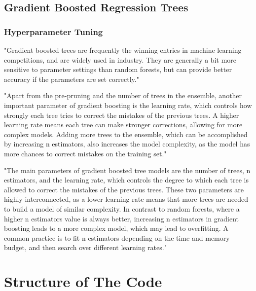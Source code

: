 \subsection{Gradient Boosted Regression Trees}

\subsubsection*{Hyperparameter Tuning}

"Gradient boosted trees are frequently the winning entries in machine
learning competitions, and are widely used in industry. They are
generally a bit more sensitive to parameter settings than random
forests, but can provide better accuracy if the parameters are set
correctly." \cite[p. 88-89]{muller_introductionmachinelearning_2016}

"Apart from the pre-pruning and the number of trees in the ensemble,
another important parameter of gradient boosting is the learning rate,
which controls how strongly each tree tries to correct the mistakes of
the previous trees. A higher learning rate means each tree can make
stronger corrections, allowing for more complex models. Adding more trees to the ensemble, which can be accomplished
by increasing
n estimators, also increases the model complexity, as the model has
more chances to correct mistakes on the training set." \cite[p. 88-89]{muller_introductionmachinelearning_2016}

"The main parameters of gradient boosted tree models are the number
of trees, n estimators, and the learning rate, which controls the degree to which each tree is allowed to correct the
mistakes of the previous trees.
These two parameters are highly interconnected, as a lower
learning rate means that more trees are needed to build a model of
similar complexity. In contrast to random forests, where a higher
n estimators value is always better, increasing n estimators in gradient
boosting leads to a more complex model, which may lead to overfitting. A
common practice is to fit n estimators depending on the time and
memory budget, and then search over different learning rates." \cite[p. 88-89]{muller_introductionmachinelearning_2016}


\section{Structure of The Code}\label{sec:structure-of-the-code}

